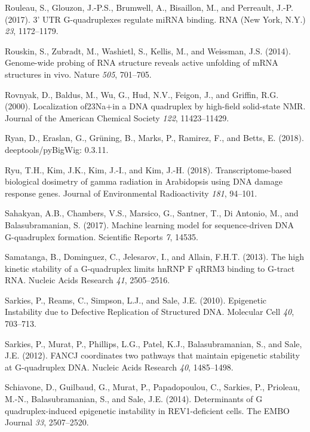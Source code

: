 \documentclass[12pt,a4paper,]{report}
\begin{document}
\leavevmode\hypertarget{ref-Rouleau2017}{}%
Rouleau, S., Glouzon, J.-P.S., Brumwell, A., Bisaillon, M., and
Perreault, J.-P. (2017). 3' UTR G-quadruplexes regulate miRNA binding.
RNA (New York, N.Y.) \emph{23}, 1172--1179.

\leavevmode\hypertarget{ref-Rouskin2014}{}%
Rouskin, S., Zubradt, M., Washietl, S., Kellis, M., and Weissman, J.S.
(2014). Genome-wide probing of RNA structure reveals active unfolding of
mRNA structures in vivo. Nature \emph{505}, 701--705.

\leavevmode\hypertarget{ref-Rovnyak2000}{}%
Rovnyak, D., Baldus, M., Wu, G., Hud, N.V., Feigon, J., and Griffin,
R.G. (2000). Localization of23Na+in a DNA quadruplex by high-field
solid-state NMR. Journal of the American Chemical Society \emph{122},
11423--11429.

\leavevmode\hypertarget{ref-Ryan2018}{}%
Ryan, D., Eraslan, G., Grüning, B., Marks, P., Ramirez, F., and Betts,
E. (2018). deeptools/pyBigWig: 0.3.11.

\leavevmode\hypertarget{ref-Ryu2018}{}%
Ryu, T.H., Kim, J.K., Kim, J.-I., and Kim, J.-H. (2018).
Transcriptome-based biological dosimetry of gamma radiation in
Arabidopsis using DNA damage response genes. Journal of Environmental
Radioactivity \emph{181}, 94--101.

\leavevmode\hypertarget{ref-Sahakyan2017}{}%
Sahakyan, A.B., Chambers, V.S., Marsico, G., Santner, T., Di Antonio,
M., and Balasubramanian, S. (2017). Machine learning model for
sequence-driven DNA G-quadruplex formation. Scientific Reports \emph{7},
14535.

\leavevmode\hypertarget{ref-Samatanga2013}{}%
Samatanga, B., Dominguez, C., Jelesarov, I., and Allain, F.H.T. (2013).
The high kinetic stability of a G-quadruplex limits hnRNP F qRRM3
binding to G-tract RNA. Nucleic Acids Research \emph{41}, 2505--2516.

\leavevmode\hypertarget{ref-Sarkies2010}{}%
Sarkies, P., Reams, C., Simpson, L.J., and Sale, J.E. (2010). Epigenetic
Instability due to Defective Replication of Structured DNA. Molecular
Cell \emph{40}, 703--713.

\leavevmode\hypertarget{ref-Sarkies2012}{}%
Sarkies, P., Murat, P., Phillips, L.G., Patel, K.J., Balasubramanian,
S., and Sale, J.E. (2012). FANCJ coordinates two pathways that maintain
epigenetic stability at G-quadruplex DNA. Nucleic Acids Research
\emph{40}, 1485--1498.

\leavevmode\hypertarget{ref-Schiavone2014}{}%
Schiavone, D., Guilbaud, G., Murat, P., Papadopoulou, C., Sarkies, P.,
Prioleau, M.-N., Balasubramanian, S., and Sale, J.E. (2014).
Determinants of G quadruplex-induced epigenetic instability in
REV1-deficient cells. The EMBO Journal \emph{33}, 2507--2520.
\end{document}
